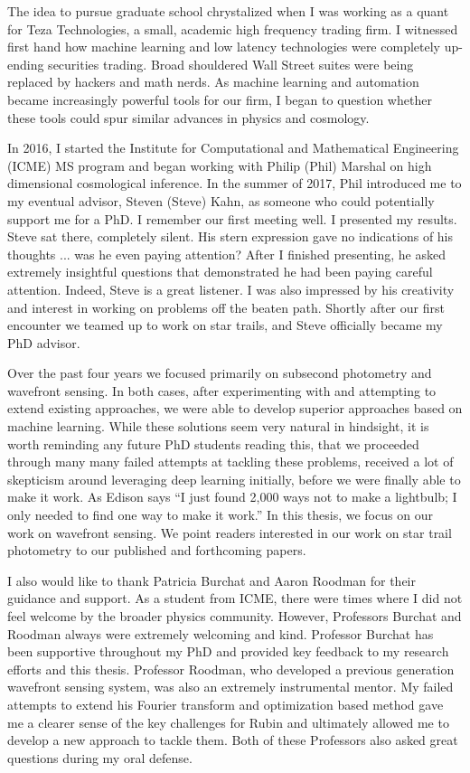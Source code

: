 
The idea to pursue graduate school chrystalized when I was working as a quant for Teza Technologies, a small, academic high frequency trading firm. I witnessed first hand how machine learning and low latency technologies were completely up-ending securities trading. Broad shouldered Wall Street suites were being replaced by hackers and math nerds. As machine learning and automation became increasingly powerful tools for our firm, I began to question whether these tools could spur similar advances in physics and cosmology. 

In 2016, I started the Institute for Computational and Mathematical Engineering (ICME) MS program and began working with Philip (Phil) Marshal on high dimensional cosmological inference. In the summer of 2017, Phil introduced me to my eventual advisor, Steven (Steve) Kahn, as someone who could potentially support me for a PhD. I remember our first meeting well. I presented my results. Steve sat there, completely silent. His stern expression gave no indications of his thoughts ... was he even paying attention? After I finished presenting, he asked extremely insightful questions that demonstrated he had been paying careful attention. Indeed, Steve is a great listener. I was also impressed by his creativity and interest in working on problems off the beaten path. Shortly after our first encounter we teamed up to work on star trails, and Steve officially became my PhD advisor. 

Over the past four years we focused primarily on subsecond photometry and wavefront sensing. In both cases, after experimenting with and attempting to extend existing approaches, we were able to develop superior approaches based on machine learning. While these solutions seem very natural in hindsight, it is worth reminding any future PhD students reading this, that we proceeded through many many failed attempts at tackling these problems, received a lot of skepticism around leveraging deep learning initially, before we were finally able to make it work. As Edison says ``I just found 2,000 ways not to make a lightbulb; I only needed to find one way to make it work.'' In this thesis, we focus on our work on wavefront sensing. We point readers interested in our work on star trail photometry to our published and forthcoming papers.

I also would like to thank Patricia Burchat and Aaron Roodman for their guidance and support. As a student from ICME, there were times where I did not feel welcome by the broader physics community. However, Professors Burchat and Roodman always were extremely welcoming and kind. Professor Burchat has been supportive throughout my PhD and provided key feedback to my research efforts and this thesis. Professor Roodman, who developed a previous generation wavefront sensing system, was also an extremely instrumental mentor. My failed attempts to extend his Fourier transform and optimization based method gave me a clearer sense of the key challenges for Rubin and ultimately allowed me to develop a new approach to tackle them. Both of these Professors also asked great questions during my oral defense.

